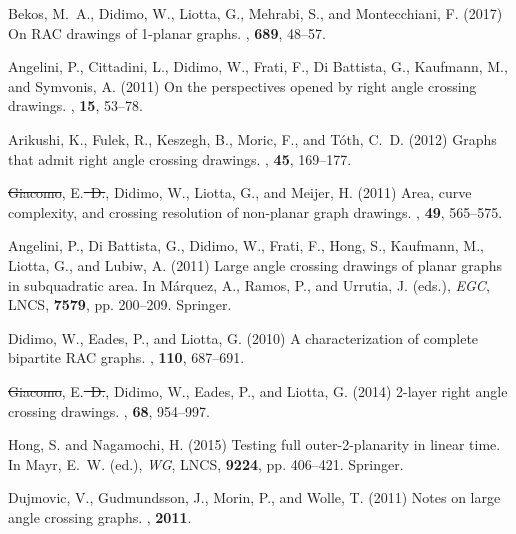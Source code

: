 \documentclass{comjnl}
\providecommand{\DIFaddtex}[1]{{\protect\color{blue}\uwave{#1}}} %
\providecommand{\DIFdeltex}[1]{{\protect\color{red}\sout{#1}}}                      %
\providecommand{\DIFaddbegin}{} %
\providecommand{\DIFaddend}{} %
\providecommand{\DIFdelbegin}{} %
\providecommand{\DIFdelend}{} %
\providecommand{\DIFadd}[1]{\texorpdfstring{\DIFaddtex{#1}}{#1}} %
\providecommand{\DIFdel}[1]{\texorpdfstring{\DIFdeltex{#1}}{}} %
\newcommand{\DIFscaledelfig}{0.5}
\newlength{\DIFdelgraphicswidth} %
\newlength{\DIFdelgraphicsheight} %
\newcommand{\DIFaddincludegraphics}[2][]{{\color{blue}\fbox{\DIFOincludegraphics[#1]{#2}}}} %
\newcommand{\DIFdelincludegraphics}[2][]{%
\sbox{\DIFdelgraphicsbox}{\DIFOincludegraphics[#1]{#2}}%
\settoboxwidth{\DIFdelgraphicswidth}{\DIFdelgraphicsbox} %
\settoboxtotalheight{\DIFdelgraphicsheight}{\DIFdelgraphicsbox} %
\scalebox{\DIFscaledelfig}{%
\parbox[b]{\DIFdelgraphicswidth}{\usebox{\DIFdelgraphicsbox}\\[-\baselineskip] \rule{\DIFdelgraphicswidth}{0em}}\llap{\resizebox{\DIFdelgraphicswidth}{\DIFdelgraphicsheight}{%
\setlength{\unitlength}{\DIFdelgraphicswidth}%
\begin{picture}(1,1)%
\thicklines\linethickness{2pt} %
{\color[rgb]{1,0,0}\put(0,0){\framebox(1,1){}}}%
{\color[rgb]{1,0,0}\put(0,0){\line( 1,1){1}}}%
{\color[rgb]{1,0,0}\put(0,1){\line(1,-1){1}}}%
\end{picture}%
}\hspace*{3pt}}} %
} %
\DeclareRobustCommand{\DIFaddbegin}{\DIFOaddbegin \let\includegraphics\DIFaddincludegraphics} %
\DeclareRobustCommand{\DIFaddend}{\DIFOaddend \let\includegraphics\DIFOincludegraphics} %
\DeclareRobustCommand{\DIFdelbegin}{\DIFOdelbegin \let\includegraphics\DIFdelincludegraphics} %
\DeclareRobustCommand{\DIFdelend}{\DIFOaddend \let\includegraphics\DIFOincludegraphics} %
\begin{document}
\begin{thebibliography}{99}
Bekos, M.~A., Didimo, W., Liotta, G., Mehrabi, S., and Montecchiani, F. (2017)
  On {RAC} drawings of 1-planar graphs.
, {\bf  689}, 48--57.

Angelini, P., Cittadini, L., Didimo, W., Frati, F., {Di Battista}, G.,
  Kaufmann, M., and Symvonis, A. (2011) On the perspectives opened by right
  angle crossing drawings.
, {\bf  15}, 53--78.

Arikushi, K., Fulek, R., Keszegh, B., Moric, F., and T{\'{o}}th, C.~D. (2012)
  Graphs that admit right angle crossing drawings.
, {\bf  45}, 169--177.

\DIFdelbegin \DIFdel{Giacomo}\DIFdelend \DIFaddbegin {\DIFadd{Di Giacomo}}\DIFaddend , E.\DIFdelbegin \DIFdel{~D.}\DIFdelend , Didimo, W., Liotta, G., and Meijer, H. (2011) Area, curve
  complexity, and crossing resolution of non-planar graph drawings.
, {\bf  49}, 565--575.

Angelini, P., {Di Battista}, G., Didimo, W., Frati, F., Hong, S., Kaufmann, M.,
  Liotta, G., and Lubiw, A. (2011) Large angle crossing drawings of planar
  graphs in subquadratic area.
\newblock In M{\'{a}}rquez, A., Ramos, P., and Urrutia, J. (eds.), {\em {EGC}},
   LNCS, {\bf7579},  pp. 200--209. Springer.

Didimo, W., Eades, P., and Liotta, G. (2010) A characterization of complete
  bipartite {RAC} graphs.
, {\bf  110}, 687--691.

\DIFdelbegin \DIFdel{Giacomo}\DIFdelend \DIFaddbegin {\DIFadd{Di Giacomo}}\DIFaddend , E.\DIFdelbegin \DIFdel{~D.}\DIFdelend , Didimo, W., Eades, P., and Liotta, G. (2014) 2-layer right
  angle crossing drawings.
, {\bf  68}, 954--997.

Hong, S. and Nagamochi, H. (2015) Testing full outer-2-planarity in linear
  time.
\newblock In Mayr, E.~W. (ed.), {\em {WG}},  LNCS, {\bf9224},  pp. 406--421.
  Springer.

Dujmovic, V., Gudmundsson, J., Morin, P., and Wolle, T. (2011) Notes on large
  angle crossing graphs.
, {\bf  2011}.


\end{thebibliography}
\end{document}

